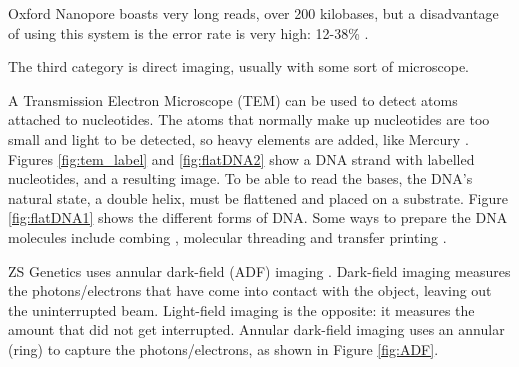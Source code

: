 \documentclass[../main/thesis.tex]{subfiles}
\begin{document}
Oxford Nanopore boasts very long reads, over 200 kilobases, but a disadvantage of using this system is the error rate is very high: 12-38\% \cite{minION_error1}\cite{minION_error2}.


The third category is direct imaging, usually with some sort of microscope.

A Transmission Electron Microscope (TEM) can be used to detect atoms attached to nucleotides.
The atoms that normally make up nucleotides are too small and light to be detected, so heavy elements are added, like Mercury \cite{tem}.
Figures \ref{fig:tem_label} and \ref{fig:flatDNA2} show a DNA strand with labelled nucleotides, and a resulting image.
To be able to read the bases, the DNA's natural state, a double helix, must be flattened and placed on a substrate.
Figure \ref{fig:flatDNA1} shows the different forms of DNA.
Some ways to prepare the DNA molecules include combing \cite{combing1}\cite{combing2}, molecular threading \cite{molecular_threading} and transfer printing \cite{transfer_printing}.





ZS Genetics uses annular dark-field (ADF) imaging \cite{ADF}.
Dark-field imaging measures the photons/electrons that have come into contact with the object, leaving out the uninterrupted beam.
Light-field imaging is the opposite: it measures the amount that did not get interrupted.
Annular dark-field imaging uses an annular (ring) to capture the photons/electrons, as shown in Figure \ref{fig:ADF}.

\end{document}
